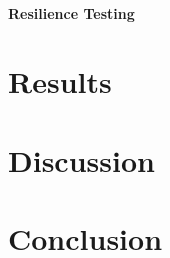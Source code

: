 \subsubsection{Resilience Testing}

\newpage
\chapter{Results}
\label{sec:reults}

\newpage
\chapter{Discussion}
\label{sec:discussion}

\newpage
\chapter{Conclusion}
\label{sec:conclusion}


\newpage
\printbibliography[heading=bibnumbered]  

